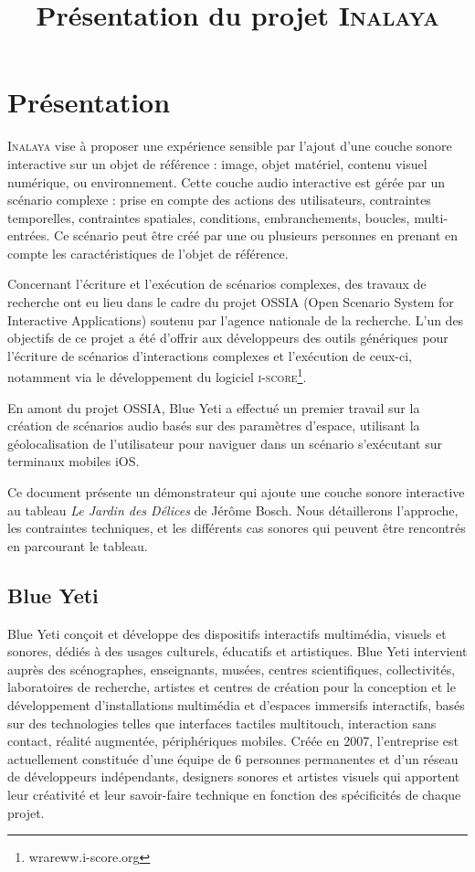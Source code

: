 \documentclass[french]{article}
\title{Présentation du projet \textsc{Inalaya}}
\date{}
\begin{document}
    \maketitle
    \section*{Présentation}
    \textsc{Inalaya} vise à proposer une expérience sensible par l’ajout d’une couche sonore interactive sur 
    un objet de référence : image, objet matériel, contenu visuel numérique, ou environnement.
    Cette couche audio interactive est gérée par un scénario complexe : prise en compte 
    des  actions des utilisateurs, contraintes temporelles, contraintes spatiales, conditions, 
    embranchements, boucles, multi-entrées. 
    Ce scénario peut être créé par une ou plusieurs personnes en prenant en compte les caractéristiques de l’objet de référence.
    
    Concernant l’écriture et l’exécution de scénarios complexes, des travaux de recherche ont eu lieu 
    dans le cadre du projet \textsc{OSSIA} (Open Scenario System for Interactive Applications) soutenu 
    par l’agence nationale de la recherche.
    L’un des objectifs de ce projet a été d’offrir aux développeurs des outils génériques pour l’écriture de scénarios d’interactions complexes et l’exécution de ceux-ci, notamment via le développement du logiciel \textsc{i-score}\footnote{wrareww.i-score.org}.
    
    En amont du projet OSSIA, Blue Yeti a effectué un premier travail sur la création de scénarios 
    audio basés sur des paramètres d’espace, utilisant la géolocalisation de l’utilisateur pour 
    naviguer dans un scénario s’exécutant sur terminaux mobiles iOS.
    
    Ce document présente un démonstrateur qui ajoute une couche sonore interactive au tableau \emph{Le Jardin des Délices} de Jérôme Bosch.
    Nous détaillerons l'approche, les contraintes techniques, et les différents cas sonores qui peuvent être rencontrés en parcourant le tableau.
    
    \subsection*{Blue Yeti}
    Blue Yeti conçoit et développe des dispositifs interactifs multimédia, visuels et sonores, dédiés à des usages culturels, éducatifs et artistiques.
    Blue Yeti intervient auprès des scénographes, enseignants, musées, centres scientifiques, collectivités, laboratoires de recherche, artistes et centres de création pour la conception et le développement d'installations multimédia et d’espaces immersifs interactifs, basés sur des technologies telles que interfaces tactiles multitouch, interaction sans contact, réalité augmentée, périphériques mobiles.
    Créée en 2007, l'entreprise est actuellement constituée d’une équipe de 6 personnes permanentes et d’un réseau de développeurs indépendants, designers sonores et artistes visuels qui apportent leur créativité et leur savoir-faire technique en fonction des spécificités de chaque projet.
    
\end{document}
